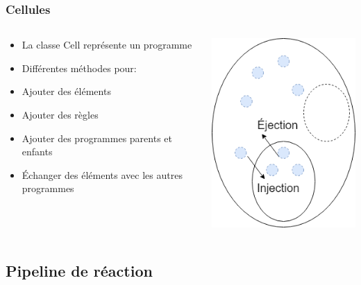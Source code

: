 \documentclass{beamer}
\begin{document}
\begin{frame}
\frametitle{Cellules}
\begin{columns}

\begin{column}{6cm}
\begin{itemize}
    \item La classe Cell représente un programme
    \item Différentes méthodes pour:
    \item Ajouter des éléments
    \item Ajouter des règles
    \item Ajouter des programmes parents et enfants
    \item Échanger des éléments avec les autres programmes
\end{itemize}
\end{column}

\begin{column}{6cm}
\begin{center}
\includegraphics[scale=0.4]{img/Cell.png}
\end{center}
\end{column}
\end{columns}
\end{frame}

\subsection{Pipeline de réaction}
\end{document}
